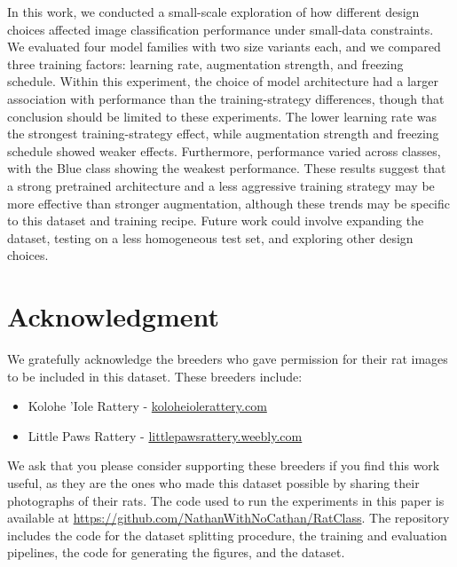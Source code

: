 \documentclass[conference]{IEEEtran}
\begin{document}
In this work, we conducted a small-scale exploration of how different design choices affected image classification performance under small-data constraints. We evaluated four model families with two size variants each, and we compared three training factors: learning rate, augmentation strength, and freezing schedule. Within this experiment, the choice of model architecture had a larger association with performance than the training-strategy differences, though that conclusion should be limited to these experiments. The lower learning rate was the strongest training-strategy effect, while augmentation strength and freezing schedule showed weaker effects. Furthermore, performance varied across classes, with the Blue class showing the weakest performance. These results suggest that a strong pretrained architecture and a less aggressive training strategy may be more effective than stronger augmentation, although these trends may be specific to this dataset and training recipe. Future work could involve expanding the dataset, testing on a less homogeneous test set, and exploring other design choices.

\section*{Acknowledgment}
We gratefully acknowledge the breeders who gave permission for their rat images to be included in this dataset. These breeders include:

\begin{itemize}
    \item Kolohe 'Iole Rattery - \href{https://koloheiolerattery.com/}{koloheiolerattery.com}
    \item Little Paws Rattery - \href{https://iowalittlepawsrattery.weebly.com/}{littlepawsrattery.weebly.com}
\end{itemize}

We ask that you please consider supporting these breeders if you find this work useful, as they are the ones who made this dataset possible by sharing their photographs of their rats. The code used to run the experiments in this paper is available at \url{https://github.com/NathanWithNoCathan/RatClass}. The repository includes the code for the dataset splitting procedure, the training and evaluation pipelines, the code for generating the figures, and the dataset.



\end{document}
